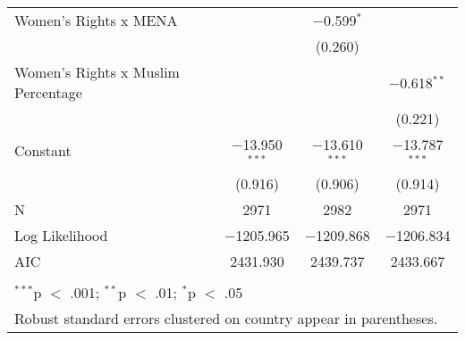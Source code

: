 \begin{table}[!htbp]
\begin{tabular}{@{\extracolsep{5pt}}lccc}
  Women's Rights x MENA &  & $-$0.599$^{*}$ &  \\ 
  &  & (0.260) &  \\ 
  Women's Rights x Muslim Percentage &  &  & $-$0.618$^{**}$ \\ 
  &  &  & (0.221) \\ 
  Constant & $-$13.950$^{***}$ & $-$13.610$^{***}$ & $-$13.787$^{***}$ \\ 
  & (0.916) & (0.906) & (0.914) \\ 
 N & 2971 & 2982 & 2971 \\ 
Log Likelihood & $-$1205.965 & $-$1209.868 & $-$1206.834 \\ 
AIC & 2431.930 & 2439.737 & 2433.667 \\ 
\hline \\[-1.8ex] 
\multicolumn{4}{l}{$^{***}$p $<$ .001; $^{**}$p $<$ .01; $^{*}$p $<$ .05} \\ 
\multicolumn{4}{l}{Robust standard errors clustered on country appear in parentheses.} \\ 
\end{tabular} 
\end{table} 
